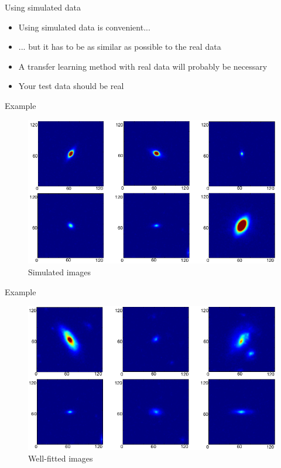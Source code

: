 \documentclass[xcolor=pdftex,dvipsnames,table,mathserif]{beamer}
\begin{document}
\begin{frame}{Using simulated data}

  \begin{itemize}[<+->]
  \item Using simulated data is convenient...
  \item ... but it has to be as similar as possible to the real data
  \item A transfer learning method with real data will probably be necessary
  \item Your test data should be real
  \end{itemize}

\end{frame}


\begin{frame}{Example~\tiny\cite{tuccillo_deep_2018}}


    \begin{figure}[ht]
      \centering
      \includegraphics[width=\textwidth]{tuccillo_simulated}
      Simulated images
    \end{figure}

\end{frame}

\begin{frame}{Example~\tiny\cite{tuccillo_deep_2018}}


    \begin{figure}[ht]
      \centering
      \includegraphics[width=\textwidth]{tuccillo_well_fitted}
      Well-fitted images
    \end{figure}

\end{frame}
\end{document}
